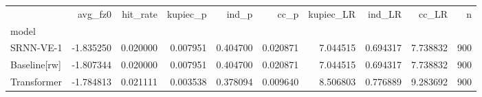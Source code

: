 \begin{tabular}{lrrrrrrrrr}
\toprule
 & avg_fz0 & hit_rate & kupiec_p & ind_p & cc_p & kupiec_LR & ind_LR & cc_LR & n \\
model &  &  &  &  &  &  &  &  &  \\
\midrule
SRNN-VE-1 & -1.835250 & 0.020000 & 0.007951 & 0.404700 & 0.020871 & 7.044515 & 0.694317 & 7.738832 & 900 \\
Baseline[rw] & -1.807344 & 0.020000 & 0.007951 & 0.404700 & 0.020871 & 7.044515 & 0.694317 & 7.738832 & 900 \\
Transformer & -1.784813 & 0.021111 & 0.003538 & 0.378094 & 0.009640 & 8.506803 & 0.776889 & 9.283692 & 900 \\
\bottomrule
\end{tabular}
